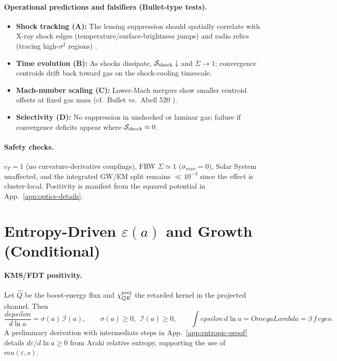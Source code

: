 \documentclass[aps,prd,onecolumn,superscriptaddress,nofootinbib]{revtex4-2}
\def\OmL{OmegaLambda}%
\def\cgeo{cgeo}%
\def\eps{epsilon}%
\def\mu{mu}%
\def\Omega_\Lambda{OmegaLambda}%
\providecommand{\OmL}{\Omega_\Lambda}
\providecommand{\cgeo}{c_{\rm geo}}
\providecommand{\eps}{\varepsilon}
\providecommand{\be}{\begin{equation}}
\providecommand{\ee}{\end{equation}}
\begin{document}
\paragraph{Operational predictions and falsifiers (Bullet-type tests).}
\begin{itemize}[leftmargin=*,noitemsep,topsep=0pt]
\item \textbf{Shock tracking (A):} The lensing suppression should spatially correlate with X-ray shock edges (temperature/surface-brightness jumps) and radio relics (tracing high-\(\sigma^2\) regions) \cite{Markevitch2002,vanWeeren2019}.
\item \textbf{Time evolution (B):} As shocks dissipate, \(\mathcal S_{\rm shock}\downarrow\) and \(\Sigma\to1\); convergence centroids drift back toward gas on the shock-cooling timescale.
\item \textbf{Mach-number scaling (C):} Lower-Mach mergers show smaller centroid offsets at fixed gas mass (cf.\ Bullet vs.\ Abell 520 \cite{Mahdavi2007}).
\item \textbf{Selectivity (D):} No suppression in unshocked or laminar gas; failure if convergence deficits appear where \(\mathcal S_{\rm shock}\approx 0\).
\end{itemize}

\paragraph{Safety checks.} \(c_T=1\) (no curvature-derivative couplings), FRW \(\Sigma\simeq1\) (\(\sigma_{\mu\nu}=0\)), Solar System unaffected, and the integrated GW/EM split remains \(\ll 10^{-3}\) since the effect is cluster-local. Positivity is manifest from the squared potential in App.~\ref{app:optics-details}.

\vspace{1ex}

\section{Entropy-Driven \texorpdfstring{$\varepsilon(a)$}{epsilon(a)} and Growth (Conditional)}
\label{sec:epsilon}

\paragraph{KMS/FDT positivity.}
Let \(\hat Q\) be the boost-energy flux and \(\chi_{QK}^{\rm proj}\) the retarded kernel in the projected channel. Then
\be
\frac{d\eps}{d\ln a}=\sigma(a)\,\mathcal I(a),\qquad \sigma(a)\ge 0,\ \ \mathcal I(a)\ge 0,\qquad
\int \eps\,d\ln a=\OmL=\beta\,f\,\cgeo.
\ee
A preliminary derivation with intermediate steps in App.~\ref{app:entropic-proof} details \(d\varepsilon/d\ln a \ge 0\) from Araki relative entropy, supporting the use of \(\mu(\varepsilon,s)\).
\end{document}
